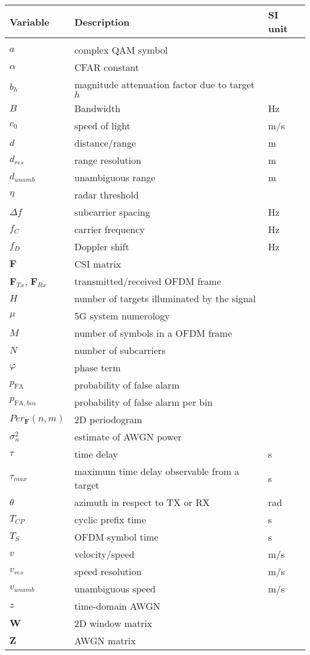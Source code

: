 \documentclass{Configuration_Files/PoliMi3i_thesis}
\begin{document}
\begin{longtable}[c]{lll}
		\textbf{Variable} & \textbf{Description} & \textbf{SI unit} \\\hline\\[-9px]
		$a$ & complex QAM symbol &  \\[1px]
		$\alpha$ & CFAR constant & \\[1px]
		$b_h$ & magnitude attenuation factor due to target $h$ &  \\[2px]
		$B$ & Bandwidth & Hz \\[1px]
		$c_0$ & speed of light & m/s \\[1px]
		$d$ & distance/range & m \\[2px]
		$d_{res}$ & range resolution & m \\[2px]
		$d_{unamb}$ & unambiguous range & m \\[2px]
		$\eta$ & radar threshold &  \\[2px]
		$\Delta f$ & subcarrier spacing  & Hz \\[2px]	
		$f_C$ & carrier frequency & Hz \\[2px]
		$f_D$ & Doppler shift & Hz \\[2px]
		$\mathbf F$ & CSI matrix &  \\[2px]
		$\mathbf F_{Tx}$, $\mathbf F_{Rx}$ & transmitted/received OFDM frame &  \\[2px]
		$H$ & number of targets illuminated by the signal &  \\[2px]
		$\mu$ & 5G system numerology &  \\[2px]
		$M$ & number of symbols in a OFDM frame &  \\[2px]
		$N$ & number of subcarriers &  \\[2px]
		$\varphi$ & phase term & \\[2px]
		$p_{\text{FA}}$ & probability of false alarm &  \\[2px]
		$p_{\text{FA},bin}$ & probability of false alarm per bin &  \\[2px]
		$Per_{\mathbf F}(n,m)$ & 2D periodogram &  \\[2px]
		$\sigma_n^2$ & estimate of AWGN power &  \\[2px]
		$\tau$ & time delay & s \\[2px]
		$\tau_{max}$ & maximum time delay observable from a target & s \\[2px]
		$\theta$ & azimuth in respect to TX or RX & rad \\[2px]
		$T_{CP}$ & cyclic prefix time & s \\[2px]
		$T_S$ & OFDM symbol time &  s \\[2px]
		$v$ & velocity/speed & m/s \\[2px]
		$v_{res}$ & speed resolution & m/s \\[2px]
		$v_{unamb}$ & unambiguous speed & m/s \\[2px]
		$z$ & time-domain AWGN &  \\[2px]
		$\mathbf W$ & 2D window matrix &  \\[2px]
		$\mathbf Z$ & AWGN matrix &  \\[2px]
\end{longtable}
\end{document}
